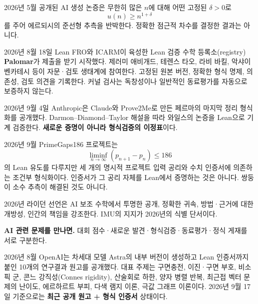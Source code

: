 \begin{fact}
2026년 5월 공개된 AI 생성 논증은 무한히 많은 $n$에 대해 어떤 고정된 $\delta>0$로
\[
u(n)\ge n^{1+\delta}
\]
를 주어 에르되시의 준선형 추측을 반박한다.
정확한 점근적 차수를 결정한 결과는 아니다.
\end{fact}

\begin{fact}[Palomar]
2026년 8월 18일 Lean FRO와 ICARM이 육성한 Lean 검증 수학 등록소(registry) \textbf{Palomar}가 제출을 받기 시작했다. 제러미 애비개드, 테렌스 타오, 라비 바킬, 악샤이 벤카테시 등이 자문·검토 생태계에 참여한다.
고정된 원본 버전, 정확한 형식 명제, 의존성, 검토 의견을 기록한다.
커널 검사는 독창성이나 일반적인 동료평가를 자동으로 보증하지 않는다.
\end{fact}

\begin{fact}
2026년 9월 4일 Anthropic은 Claude와 Prove2Me로 만든 페르마의 마지막 정리 형식화를 공개했다.
Darmon--Diamond--Taylor 해설을 따라 와일스의 논증을 Lean으로 기계 검증한다.
\textbf{새로운 증명이 아니라 형식검증의 이정표}이다.
\end{fact}

\begin{fact}[소수 간격 186]
2026년 9월 PrimeGaps186 프로젝트는
\[
\liminf_{n\to\infty}(p_{n+1}-p_n)\le186
\]
의 Lean 유도를 다루지만 세 개의 명시적 프로젝트 입력 공리와 수치 인증서에 의존하는 조건부 형식화이다. 인증서가 그 공리 자체를 Lean에서 증명하는 것은 아니다. 쌍둥이 소수 추측이 해결된 것도 아니다.
\end{fact}

\begin{fact}
2026년 라이던 선언은 AI 보조 수학에서
투명한 공개, 정확한 귀속, 방법·근거에 대한 개방성, 인간의 책임을 강조한다.
IMU의 지지가 2026년의 식별 단서이다.
\end{fact}

\noindent\textbf{AI 관련 문제를 만나면.} 대회 점수·새로운 발견·형식검증·동료평가·정식 게재를 서로 구분한다.


\begin{fact}
2026년 8월 OpenAI는 차세대 모델 Astra의 내부 버전이 생성하고 Lean 인증서까지 붙인 10개의 연구결과 원고를 공개했다. 대표 주제는 구면충전, 이진·구면 부호, 비소픽 군, 콘느 강직성(Connes rigidity), 산술회로 하한, 양자 병렬 반복, 최근접 벡터 문제의 난이도, 에르하르트 부피, 다색 램지 이론, 극값 그래프 이론이다. 2026년 9월 17일 기준으로는 \textbf{최근 공개 원고 + 형식 인증서} 상태이다.
\end{fact}

